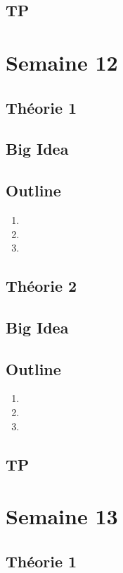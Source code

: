 \documentclass{article}
\begin{document}
\subsection{TP}

\pagebreak
\section{Semaine 12}
\subsection{Théorie 1}
\subsection*{Big Idea}
\subsection*{Outline}
    \begin{enumerate}
    \item
    \item
    \item
    \end{enumerate}
\subsection{Théorie 2}
\subsection*{Big Idea}
\subsection*{Outline}
    \begin{enumerate}
    \item
    \item
    \item
    \end{enumerate}
\subsection{TP}

\pagebreak
\section{Semaine 13}
\subsection{Théorie 1}
\end{document}

